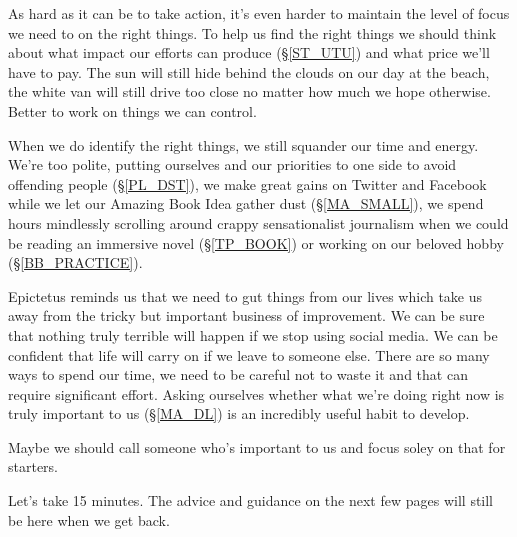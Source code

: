 \cleardoublepage
{\small

As hard as it can be to take action, it's even harder to maintain the level of focus we need to on the right things. To help us find the right things we should think about what impact our efforts can produce (\S \ref{ST_UTU}) and what price we'll have to pay. The sun will still hide behind the clouds on our day at the beach, the white van will still drive too close no matter how much we hope otherwise. Better to work on things we can control.  %

When we do identify the right things, we still squander our time and energy. We're too polite, putting ourselves and our priorities to one side to avoid offending people (\S \ref{PL_DST}), we make great gains on Twitter and Facebook while we let our Amazing Book Idea gather dust (\S \ref{MA_SMALL}), we spend hours mindlessly scrolling around crappy sensationalist journalism when we could be reading an immersive novel (\S \ref{TP_BOOK}) or working on our beloved hobby (\S \ref{BB_PRACTICE}). 

Epictetus reminds us that we need to gut things from our lives which take us away from the tricky but important business of improvement. We can be sure that nothing truly terrible will happen if we stop using social media. We can be confident that life will carry on if we leave  to someone else. There are so many ways to spend our time, we need to be careful not to waste it and that can require significant effort. Asking ourselves whether what we're doing right now is truly important to us (\S \ref{MA_DL}) is an incredibly useful habit to develop.

Maybe we should call someone who's important to us and focus soley on that for starters. 

Let's take 15 minutes. The advice and guidance on the next few pages will still be here when we get back. 

}
